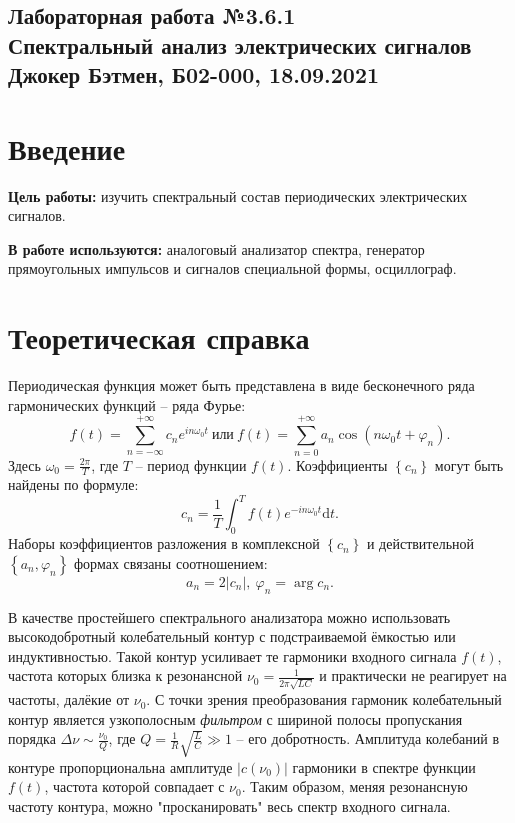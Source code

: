 \documentclass[a4paper,10pt]{article}
\begin{document}
  
\begin{center}
  \section*{Лабораторная работа №3.6.1 \\Спектральный анализ электрических сигналов\\Джокер Бэтмен, Б02-000, 18.09.2021}
\end{center}  

\vspace{5mm}
\section*{Введение}

\begin{flushleft}
  \textbf{Цель работы:} изучить спектральный состав периодических электрических сигналов.

\end{flushleft}

\begin{flushleft}
  \textbf{В работе используются:} аналоговый анализатор спектра, генератор прямоугольных импульсов и сигналов специальной формы, осциллограф.

\end{flushleft}

\section*{Теоретическая справка}

Периодическая функция может быть представлена в виде бесконечного ряда гармонических функций -- ряда Фурье:\[f(t)=\sum_{n=-\infty}^{+\infty}c_ne^{in\omega_0t}\ \text{или}\ f(t)=\sum_{n=0}^{+\infty}a_n\cos{\left(n\omega_0t+\varphi_n\right)}.\]Здесь $\omega_0=\frac{2\pi}{T}$, где $T$ -- период функции $f(t)$. Коэффициенты $\left\{c_n\right\}$ могут быть найдены по формуле:\[c_n=\frac{1}{T}\int_0^Tf(t)e^{-in\omega_0t}\text{d}t.\]Наборы коэффициентов разложения в комплексной $\left\{c_n\right\}$ и действительной $\left\{a_n,\varphi_n\right\}$ формах связаны соотношением:\[a_n=2\left|c_n\right|,\ \varphi_n=\arg{c_n}.\]

В качестве простейшего спектрального анализатора можно использовать высокодобротный колебательный контур с подстраиваемой ёмкостью или индуктивностью. Такой контур усиливает те гармоники входного сигнала $f(t)$, частота которых близка к резонансной $\nu_0=\frac{1}{2\pi\sqrt{LC}}$ и практически не реагирует на частоты, далёкие от $\nu_0$. С точки зрения преобразования гармоник колебательный контур является узкополосным \textit{фильтром} с шириной полосы пропускания порядка $\Delta\nu\sim\frac{\nu_0}{Q}$, где $Q=\frac{1}{R}\sqrt{\frac{L}{C}}\gg1$ -- его добротность. Амплитуда колебаний в контуре пропорциональна амплитуде $\left|c\left(\nu_0\right)\right|$ гармоники в спектре функции $f(t)$, частота которой совпадает с $\nu_0$. Таким образом, меняя резонансную частоту контура, можно "просканировать" весь спектр входного сигнала.
\end{document}
